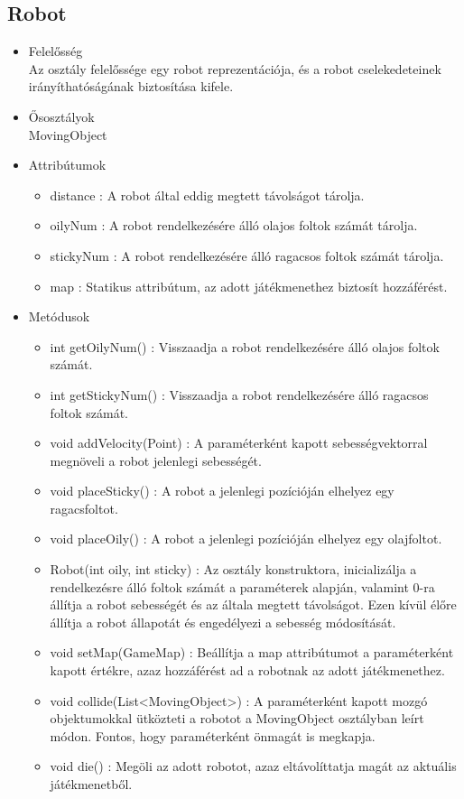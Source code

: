 \subsection{Robot}
\begin{itemize}
	\item Felelősség\\
	Az osztály felelőssége egy robot reprezentációja, és a robot cselekedeteinek irányíthatóságának biztosítása kifele.
	\item Ősosztályok\\
	MovingObject
	\item Attribútumok
	\begin{itemize}
		\item distance : A robot által eddig megtett távolságot tárolja.
		\item oilyNum : A robot rendelkezésére álló olajos foltok számát tárolja.
		\item stickyNum : A robot rendelkezésére álló ragacsos foltok számát tárolja.
		\item map : Statikus attribútum, az adott játékmenethez biztosít hozzáférést.
	\end{itemize}
	\item Metódusok
	\begin{itemize}
		\item int getOilyNum() : Visszaadja a robot rendelkezésére álló olajos foltok számát.
		\item int getStickyNum() : Visszaadja a robot rendelkezésére álló ragacsos foltok számát.
		\item void addVelocity(Point) : A paraméterként kapott sebességvektorral megnöveli a robot jelenlegi sebességét.
		\item void placeSticky() : A robot a jelenlegi pozícióján elhelyez egy ragacsfoltot.
		\item void placeOily() : A robot a jelenlegi pozícióján elhelyez egy olajfoltot.
		\item Robot(int oily, int sticky) : Az osztály konstruktora, inicializálja a rendelkezésre álló foltok számát a paraméterek alapján, valamint 0-ra állítja a robot sebességét és az általa megtett távolságot. Ezen kívül élőre állítja a robot állapotát és engedélyezi a sebesség módosítását.
		\item void setMap(GameMap) : Beállítja a map attribútumot a paraméterként kapott értékre, azaz hozzáférést ad a robotnak az adott játékmenethez.
		\item void collide(List<MovingObject>) : A paraméterként kapott mozgó objektumokkal ütközteti a robotot a MovingObject osztályban leírt módon. Fontos, hogy paraméterként önmagát is megkapja.
		\item void die() : Megöli az adott robotot, azaz eltávolíttatja magát az aktuális játékmenetből.
	\end{itemize}
\end{itemize}

